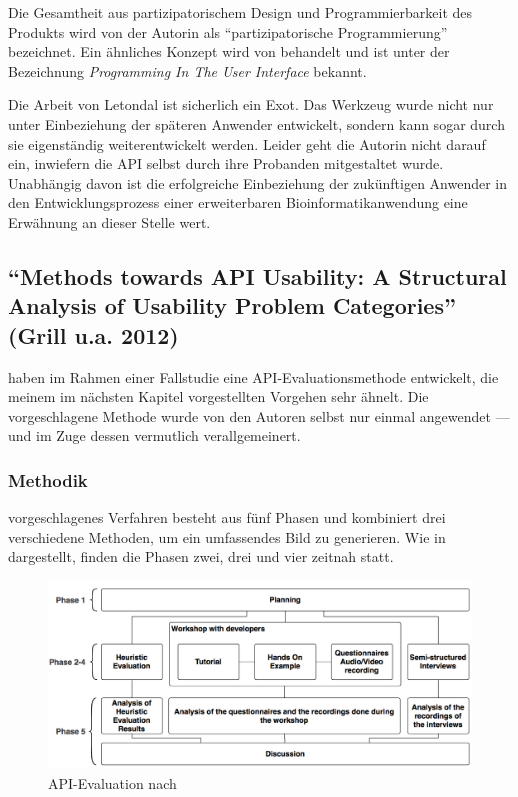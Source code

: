 Die Gesamtheit aus partizipatorischem Design \citep{Stiemerling:1997:MSS:263552.263646} und Programmierbarkeit des Produkts wird von der Autorin als ``partizipatorische Programmierung'' bezeichnet. Ein ähnliches Konzept wird von \cite{Carroll:1990ex} behandelt und ist unter der Bezeichnung \textit{Programming In The User Interface} bekannt.

Die Arbeit von Letondal ist sicherlich ein Exot. Das Werkzeug wurde nicht nur unter Einbeziehung der späteren Anwender entwickelt, sondern kann sogar durch sie eigenständig weiterentwickelt werden. Leider geht die Autorin nicht darauf ein, inwiefern die API selbst durch ihre Probanden mitgestaltet wurde. Unabhängig davon ist die erfolgreiche Einbeziehung der zukünftigen Anwender in den Entwicklungsprozess einer erweiterbaren Bioinformatikanwendung eine Erwähnung an dieser Stelle wert. 











\subsection{``Methods towards API Usability: A Structural Analysis of Usability Problem Categories'' (Grill u.a. 2012)}
\label{sec:grill}

\cite{Grill:2012jm} haben im Rahmen einer Fallstudie eine API-Evaluationsmethode entwickelt, die meinem im nächsten Kapitel vorgestellten Vorgehen sehr ähnelt. Die vorgeschlagene Methode wurde von den Autoren selbst nur einmal angewendet --- und im Zuge dessen vermutlich verallgemeinert. 

\subsubsection{Methodik}

\cite{Grill:2012jm} vorgeschlagenes Verfahren besteht aus fünf Phasen und kombiniert drei verschiedene Methoden, um ein umfassendes Bild zu generieren. Wie in  dargestellt, finden die Phasen zwei, drei und vier zeitnah statt.

\begin{figure}
  \centering
    \includegraphics[width=0.9\linewidth]{Figures/grill.png}
    \caption{API-Evaluation nach \cite{Grill:2012jm}}
    \label{fig:grill}
\end{figure}

